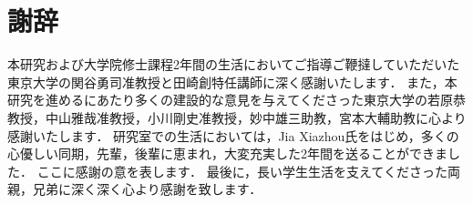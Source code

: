 \chapter*{謝辞}

本研究および大学院修士課程2年間の生活においてご指導ご鞭撻していただいた東京大学の関谷勇司准教授と田崎創特任講師に深く感謝いたします．
また，本研究を進めるにあたり多くの建設的な意見を与えてくださった東京大学の若原恭教授，中山雅哉准教授，小川剛史准教授，妙中雄三助教，宮本大輔助教に心より感謝いたします．
研究室での生活においては，Jia Xiazhou氏をはじめ，多くの心優しい同期，先輩，後輩に恵まれ，大変充実した2年間を送ることができました．
ここに感謝の意を表します．
最後に，長い学生生活を支えてくださった両親，兄弟に深く深く心より感謝を致します．